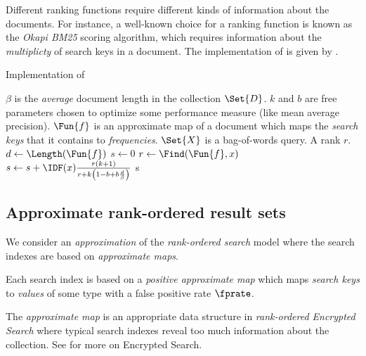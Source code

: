 \documentclass[ ../main.tex]{subfiles}
\begin{document}
Different ranking functions require different kinds of information about the documents. For instance, a well-known choice for a ranking function is known as the \emph{Okapi BM25} scoring algorithm, which requires information about the \emph{multiplicty} of search keys in a document. The implementation of \OkapiBM is given by .
\begin{algorithm}[h]
    \caption{Implementation of \protect\OkapiBM}
    \label{alg:bm25}
    \DontPrintSemicolon    
    \parameters
    {
        $\beta$ is the \emph{average} document length in the collection $\Set{D}$. $k$ and $b$ are free parameters chosen to optimize some performance measure (like mean average precision).
    }
    \KwIn
    {
        $\Fun{f}$ is an approximate map of a document which maps the \emph{search keys} that it contains to \emph{frequencies}.
        $\Set{X}$ is a bag-of-words query.
    }
    \KwOut
    {
        A rank $r$.
    }
    {
        $d \gets \Length(\Fun{f})$\;    
        $s \gets 0$\;
        {
            {
                $r \gets \Find(\Fun{f}, x)$\;
                $s \gets s + \IDF(x) \frac{r (k + 1)}{r + k\left(1 - b + b \frac{d}{\beta}\right)}$\;
            }
        }
        \Return s\;
    }
\end{algorithm}

\subsection{Approximate rank-ordered result sets}
We consider an \emph{approximation} of the \emph{rank-ordered search} model where the search indexes are based on \emph{approximate maps}.
\begin{assumption}
Each search index is based on a \emph{positive approximate map} which maps \emph{search keys} to \emph{values} of some type with a false positive rate $\fprate$.
\end{assumption}
The \emph{approximate map} is an appropriate data structure in \emph{rank-ordered Encrypted Search}\cite{es} where typical search indexes reveal too much information about the collection. See  for more on Encrypted Search.
\end{document}
